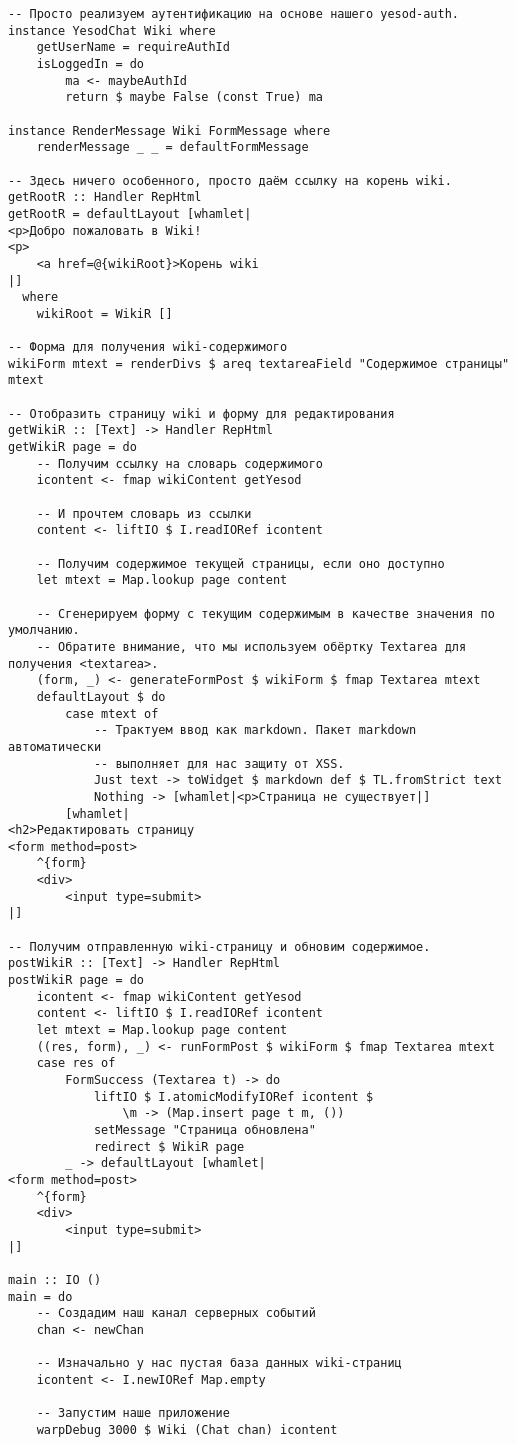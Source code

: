 \begin{lstlisting}
-- Просто реализуем аутентификацию на основе нашего yesod-auth.
instance YesodChat Wiki where
    getUserName = requireAuthId
    isLoggedIn = do
        ma <- maybeAuthId
        return $ maybe False (const True) ma

instance RenderMessage Wiki FormMessage where
    renderMessage _ _ = defaultFormMessage

-- Здесь ничего особенного, просто даём ссылку на корень wiki.
getRootR :: Handler RepHtml
getRootR = defaultLayout [whamlet|
<p>Добро пожаловать в Wiki!
<p>
    <a href=@{wikiRoot}>Корень wiki
|]
  where
    wikiRoot = WikiR []

-- Форма для получения wiki-содержимого
wikiForm mtext = renderDivs $ areq textareaField "Содержимое страницы" mtext

-- Отобразить страницу wiki и форму для редактирования
getWikiR :: [Text] -> Handler RepHtml
getWikiR page = do
    -- Получим ссылку на словарь содержимого
    icontent <- fmap wikiContent getYesod

    -- И прочтем словарь из ссылки
    content <- liftIO $ I.readIORef icontent

    -- Получим содержимое текущей страницы, если оно доступно
    let mtext = Map.lookup page content

    -- Сгенерируем форму с текущим содержимым в качестве значения по умолчанию.
    -- Обратите внимание, что мы используем обёртку Textarea для получения <textarea>.
    (form, _) <- generateFormPost $ wikiForm $ fmap Textarea mtext
    defaultLayout $ do
        case mtext of
            -- Трактуем ввод как markdown. Пакет markdown автоматически
            -- выполняет для нас защиту от XSS.
            Just text -> toWidget $ markdown def $ TL.fromStrict text
            Nothing -> [whamlet|<p>Страница не существует|]
        [whamlet|
<h2>Редактировать страницу
<form method=post>
    ^{form}
    <div>
        <input type=submit>
|]

-- Получим отправленную wiki-страницу и обновим содержимое.
postWikiR :: [Text] -> Handler RepHtml
postWikiR page = do
    icontent <- fmap wikiContent getYesod
    content <- liftIO $ I.readIORef icontent
    let mtext = Map.lookup page content
    ((res, form), _) <- runFormPost $ wikiForm $ fmap Textarea mtext
    case res of
        FormSuccess (Textarea t) -> do
            liftIO $ I.atomicModifyIORef icontent $
                \m -> (Map.insert page t m, ())
            setMessage "Страница обновлена"
            redirect $ WikiR page
        _ -> defaultLayout [whamlet|
<form method=post>
    ^{form}
    <div>
        <input type=submit>
|]

main :: IO ()
main = do
    -- Создадим наш канал серверных событий
    chan <- newChan

    -- Изначально у нас пустая база данных wiki-страниц
    icontent <- I.newIORef Map.empty

    -- Запустим наше приложение
    warpDebug 3000 $ Wiki (Chat chan) icontent
\end{lstlisting}